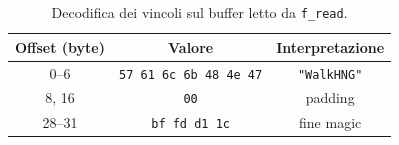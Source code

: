 \begin{table}[H]
        \centering
        \small
        \begin{tabular}{c c c}
        \toprule
        \textbf{Offset (byte)} & \textbf{Valore} & \textbf{Interpretazione} \\
        \midrule
        0--6   & \texttt{57 61 6c 6b 48 4e 47} & \texttt{"WalkHNG"} \\
        \midrule
        8, 16  & \texttt{00} & padding \\
        \midrule
        28--31 & \texttt{bf fd d1 1c} & fine magic \\
        \bottomrule
        \end{tabular}
        \caption{Decodifica dei vincoli sul buffer letto da \texttt{f\_read}.}
        \label{tab:magic-constraints}
        \end{table}
    \FloatBarrier